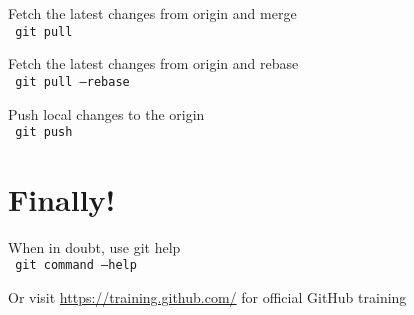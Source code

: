 \documentclass[a4paper, twoside, 11pt]{extarticle}
\begin{document}
\begin{multicols*}{2}
Fetch the latest changes from origin
and merge \\ \texttt{\color{blue} git pull}

Fetch the latest changes from origin
and rebase \\ \texttt{\color{blue} git pull --rebase}

Push local changes to the origin \\ \texttt{\color{blue} git push}

\section{Finally!}
When in doubt, use git help \\ \texttt{\color{blue} git command --help}

Or visit \url{https://training.github.com/} for official GitHub training
\end{multicols*}
\end{document}
